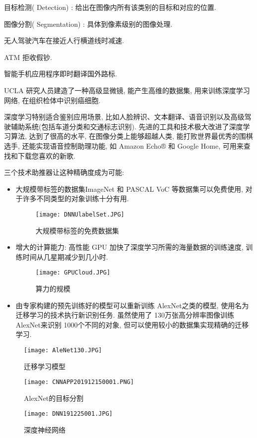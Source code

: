  目标检测( Detection) : 给出在图像内所有该类别的目标和对应的位置.

 图像分割( Segmentation) : 具体到像素级别的图像处理.

 无人驾驶汽车在接近人行横道线时减速.

 ATM 拒收假钞.

 智能手机应用程序即时翻译国外路标.

 UCLA 研究人员建造了一种高级显微镜, 能产生高维的数据集, 用来训练深度学习网络, 在组织检体中识别癌细胞.

深度学习特别适合鉴别应用场景, 比如人脸辨识、文本翻译、语音识别以及高级驾驶辅助系统(包括车道分类和交通标志识别).
先进的工具和技术极大改进了深度学习算法, 达到了很高的水平, 在图像分类上能够超越人类, 能打败世界最优秀的围棋选手, 还能实现语音控制助理功能, 如 Amazon Echo® 和 Google Home, 可用来查找和下载您喜欢的新歌.

三个技术助推器让这种精确度成为可能:
\begin{itemize}
\item 大规模带标签的数据集ImageNet 和 PASCAL VoC 等数据集可以免费使用, 对于许多不同类型的对象训练十分有用.
\begin{figure}[H]
\centering
\texttt{[image: DNNUlabelSet.JPG]}
\caption{大规模带标签的免费数据集}
\label{DNNUlabelSet201912250001}
\end{figure}
\item 增大的计算能力: 高性能 GPU 加快了深度学习所需的海量数据的训练速度, 训练时间从几星期减少到几小时.
\begin{figure}[H]
\centering
\texttt{[image: GPUCloud.JPG]}
\caption{算力的规模}
\label{GPUCloud201912250002}
\end{figure}
\item 由专家构建的预先训练好的模型可以重新训练 AlexNet之类的模型, 使用名为迁移学习的技术执行新识别任务. 虽然使用了 130万张高分辨率图像训练 AlexNet来识别 1000个不同的对象, 但可以使用较小的数据集实现精确的迁移学习.
\end{itemize}
\begin{figure}[H]
\centering
\texttt{[image: AleNet130.JPG]}
\caption{迁移学习模型}
\label{AleNet130201912250003}
\end{figure}
\begin{figure}[H]
\centering
\texttt{[image: CNNAPP201912150001.PNG]}
\caption{ AlexNet的目标分割}
\label{CNNAPP201912150001}
\end{figure}
\begin{figure}[H]
\centering
\texttt{[image: DNN191225001.JPG]}
\caption{深度神经网络}
\label{DNN191225001}
\end{figure}
